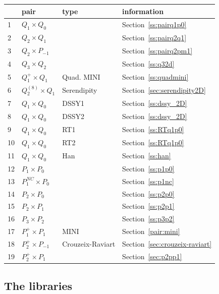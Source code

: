 \begin{tabular}{p{1cm}p{2cm}p{4cm}p{12cm}}
\hline
 &pair & type & information \\
\hline
\hline
 1&$Q_1\times Q_0$       &                  & Section~\ref{ss:pairq1p0}\\
 2&$Q_2\times Q_1$       &                  & Section~\ref{ss:pairq2q1}\\
 3&$Q_2\times P_{-1}$    &                  & Section~\ref{ss:pairq2pm1}\\
 4&$Q_3\times Q_2$       &                  & Section~\ref{ss:q32d}\\
 5&$Q_1^+\times Q_1$     & Quad. MINI       & Section~\ref{ss:quadmini}\\
 6&$Q_2^{(8)}\times Q_1$ & Serendipity      & Section~\ref{sec:serendipity2D}\\
 7&$Q_1\times Q_0$       & DSSY1            & Section~\ref{ss:dssy_2D}\\
 8&$Q_1\times Q_0$       & DSSY2            & Section~\ref{ss:dssy_2D}\\
 9&$Q_1\times Q_0$       & RT1              & Section~\ref{ss:RTq1p0}\\
10&$Q_1\times Q_0$       & RT2              & Section~\ref{ss:RTq1p0}\\
11&$Q_1\times Q_0$       & Han              & Section~\ref{ss:han}\\
12&$P_1\times P_0$       &                  & Section~\ref{ss:p1p0}\\ 
13&$P_1^{NC}\times P_0$  &                  & Section~\ref{ss:p1nc}\\
14&$P_2\times P_0$       &                  & Section~\ref{ss:p2p0}\\ 
15&$P_2\times P_1$       &                  & Section~\ref{ss:p2p1}\\
16&$P_3\times P_2$       &                  & Section~\ref{ss:p3p2}\\
17&$P_1^{+}\times P_{1}$ & MINI             & Section~\ref{pair:mini}\\
18&$P_2^+\times P_{-1}$  & Crouzeix-Raviart & Section~\ref{sec:crouzeix-raviart}\\
19&$P_2^+\times P_{1}$   &                  & Section~\ref{sec:p2pp1}\\
\hline
\end{tabular}




\subsection*{The libraries}

